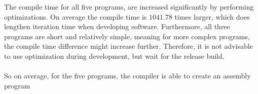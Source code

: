 \begin{table}[H]
    \noindent{}
    \caption{Results from benchmark. Diff is calculated as percentage increase from no optimizations
    to optimizations enabled.}
    \label{table:benchmark-results}
\end{table}
\noindent
The compile time for all five programs, are increased significantly by performing optimizations.
On average the compile time is $1041.78$ times larger, which does lengthen iteration time
when developing software. Furthermore, all three programs are short and relatively simple,
meaning for more complex programs, the compile time difference might increase further.
Therefore, it is not advisable to use optimization during development, but wait for the
release build.
\\
\\
So on average, for the five programs, the \lan compiler is able to create an assembly program
